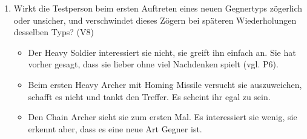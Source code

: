 \documentclass[../Main.tex]{subfiles}
\begin{document}
\begin{enumerate}[label=\textbf{B\arabic*}, leftmargin=1.5cm, itemsep=0.8em, resume]
\item Wirkt die Testperson beim ersten Auftreten eines neuen Gegnertyps zögerlich oder unsicher, und verschwindet dieses Zögern bei späteren Wiederholungen desselben Typs? \hfill (V8)
    \begin{itemize}[nosep]
        \item Der Heavy Soldier interessiert sie nicht, sie greift ihn einfach an. Sie hat vorher gesagt, dass sie lieber ohne viel Nachdenken spielt (vgl. P6).
        \item Beim ersten Heavy Archer mit Homing Missile versucht sie auszuweichen, schafft es nicht und tankt den Treffer. Es scheint ihr egal zu sein.
        \item Den Chain Archer sieht sie zum ersten Mal. Es interessiert sie wenig, sie erkennt aber, dass es eine neue Art Gegner ist.
    \end{itemize}
\end{enumerate}
\end{document}
